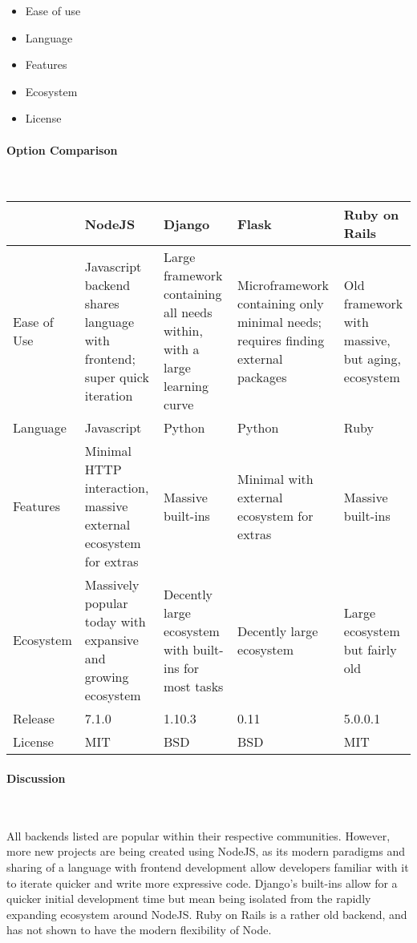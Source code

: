 \documentclass[letterpaper, 10pt, draftclsnofoot, compsoc, onecolumn]{IEEEtran}
\begin{document}
{{\begin{itemize}
\item Ease of use
\item Language
\item Features
\item Ecosystem
\item License
\end{itemize}

 \par}


\newpage
\paragraph{Option Comparison} ~\\
\vspace{1pc}
\tablehead{}
\begin{supertabular}{|p{2cm}|p{2.5cm}|p{2.5cm}|p{2.5cm}|p{2.5cm}|}
\hline & NodeJS & Django  & Flask  & Ruby on Rails \\ \hline
Ease of Use
  & Javascript backend shares language with frontend; super quick iteration
  & Large framework containing all needs within, with a large learning curve
  & Microframework containing only minimal needs; requires finding external packages
  & Old framework with massive, but aging, ecosystem \\ \hline
Language
  & Javascript
  & Python
  & Python
  & Ruby \\ \hline
Features
  & Minimal HTTP interaction, massive external ecosystem for extras
  & Massive built-ins
  & Minimal with external ecosystem for extras
  & Massive built-ins \\ \hline
Ecosystem
  & Massively popular today with expansive and growing ecosystem
  & Decently large ecosystem with built-ins for most tasks
  & Decently large ecosystem
  & Large ecosystem but fairly old \\ \hline
Release
  & 7.1.0
  & 1.10.3
  & 0.11
  & 5.0.0.1 \\ \hline
License
  & MIT
  & BSD
  & BSD
  & MIT \\ \hline
\end{supertabular}

\newpage
\paragraph{Discussion} ~\\
{\noindent
All backends listed are popular within their respective communities. However, more new projects are being created using NodeJS, as its modern paradigms and sharing of a language with frontend development allow developers familiar with it to iterate quicker and write more expressive code. Django's built-ins allow for a quicker initial development time but mean being isolated from the rapidly expanding ecosystem around NodeJS.
Ruby on Rails is a rather old backend, and has not shown to have the modern flexibility of Node.
 \par}

}
\end{document}
